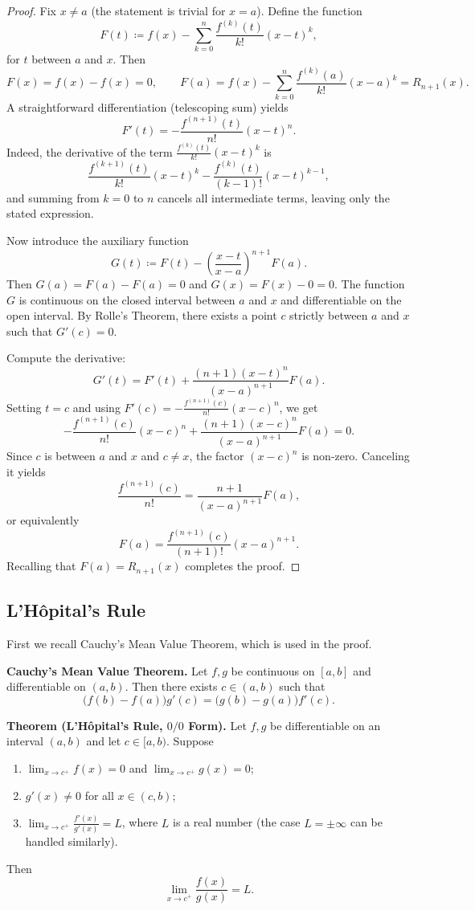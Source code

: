 \documentclass[12pt,a4paper]{article}
\theoremstyle{definition}
\begin{document}
\begin{proof}
Fix \(x\neq a\) (the statement is trivial for \(x=a\)). Define the function
\[
F(t) \coloneqq f(x) - \sum_{k=0}^{n} \frac{f^{(k)}(t)}{k!}(x-t)^k,
\]
for \(t\) between \(a\) and \(x\). Then
\[
F(x)=f(x)-f(x)=0,\qquad F(a)=f(x)-\sum_{k=0}^{n}\frac{f^{(k)}(a)}{k!}(x-a)^k = R_{n+1}(x).
\]
A straightforward differentiation (telescoping sum) yields
\[
F'(t) = -\frac{f^{(n+1)}(t)}{n!}(x-t)^n.
\]
Indeed, the derivative of the term \(\frac{f^{(k)}(t)}{k!}(x-t)^k\) is
\[
\frac{f^{(k+1)}(t)}{k!}(x-t)^k - \frac{f^{(k)}(t)}{(k-1)!}(x-t)^{k-1},
\]
and summing from \(k=0\) to \(n\) cancels all intermediate terms, leaving only the stated expression.

Now introduce the auxiliary function
\[
G(t) \coloneqq F(t) - \left(\frac{x-t}{x-a}\right)^{\!n+1} F(a).
\]
Then \(G(a)=F(a)-F(a)=0\) and \(G(x)=F(x)-0=0\). The function \(G\) is continuous on the closed interval between \(a\) and \(x\) and differentiable on the open interval. By Rolle's Theorem, there exists a point \(c\) strictly between \(a\) and \(x\) such that \(G'(c)=0\).

Compute the derivative:
\[
G'(t) = F'(t) + \frac{(n+1)(x-t)^n}{(x-a)^{n+1}} F(a).
\]
Setting \(t=c\) and using \(F'(c) = -\frac{f^{(n+1)}(c)}{n!}(x-c)^n\), we get
\[
-\frac{f^{(n+1)}(c)}{n!}(x-c)^n + \frac{(n+1)(x-c)^n}{(x-a)^{n+1}} F(a) = 0.
\]
Since \(c\) is between \(a\) and \(x\) and \(c\neq x\), the factor \((x-c)^n\) is non‑zero. Canceling it yields
\[
\frac{f^{(n+1)}(c)}{n!} = \frac{n+1}{(x-a)^{n+1}} F(a),
\]
or equivalently
\[
F(a) = \frac{f^{(n+1)}(c)}{(n+1)!}(x-a)^{n+1}.
\]
Recalling that \(F(a)=R_{n+1}(x)\) completes the proof.
\end{proof}

\subsection{L'H\^opital's Rule}

First we recall Cauchy's Mean Value Theorem, which is used in the proof.

\textbf{Cauchy's Mean Value Theorem.} Let \(f,g\) be continuous on \([a,b]\) and differentiable on \((a,b)\). Then there exists \(c\in(a,b)\) such that
\[
\bigl(f(b)-f(a)\bigr)g'(c) = \bigl(g(b)-g(a)\bigr)f'(c).
\]

\textbf{Theorem (L'H\^opital's Rule, \(0/0\) Form).} Let \(f,g\) be differentiable on an interval \((a,b)\) and let \(c\in[a,b)\). Suppose
\begin{enumerate}[label=(\roman*)]
    \item \(\lim_{x\to c^+} f(x) = 0\) and \(\lim_{x\to c^+} g(x) = 0\);
    \item \(g'(x)\neq0\) for all \(x\in(c,b)\);
    \item \(\lim_{x\to c^+} \frac{f'(x)}{g'(x)} = L\), where \(L\) is a real number (the case \(L=\pm\infty\) can be handled similarly).
\end{enumerate}
Then
\[
\lim_{x\to c^+} \frac{f(x)}{g(x)} = L.
\]
\end{document}

